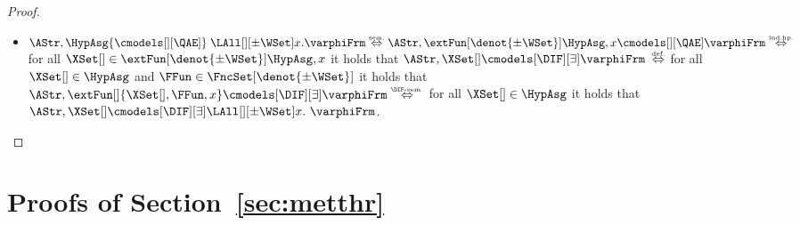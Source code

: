 \documentclass[authoryear]{elsarticle}
\newcommand{\iffExpl}[1]{\mathrel{\stackrel{\text{\tiny #1}}{\Leftrightarrow}}}
\newcommand{\Team}[1][]{{\XSet[#1]}}
\newcommand{\AEmodels}{{\cmodels[][\QAE]}}
\begin{document}
\begin{proof}
\begin{itemize}
\begin{itemize}
    \item[{$(\varphiFrm[][_\forall] = \LAll[][\pm\WSet] x. \varphiFrm)$}]
      $\AStr, \HypAsg \AEmodels\; \LAll[][\pm\WSet] x. \varphiFrm \iffExpl{sem.}
      \AStr, \extFun[\denot{\pm\WSet}]{\HypAsg, x} \AEmodels \varphiFrm
      \iffExpl{ind.hp.}$ for all $\Team \in \extFun[\denot{\pm\WSet}]{\HypAsg,
        x}$ it holds that $\AStr, \Team\cmodels[\DIF][\exists] \varphiFrm$
      $\iffExpl{def.}$ for all $\Team \in \HypAsg$ and $\FFun \in
      \FncSet[\denot{\pm\WSet}]{}$ it holds that $\AStr,
      \extFun[]{\Team,\FFun,x}\cmodels[\DIF][\exists]\varphiFrm\iffExpl{\DIF-sem.}$
      for all $\Team \in \HypAsg$ it holds that $\AStr, \Team
      \cmodels[\DIF][\exists] \LAll[][\pm\WSet] x.\ \varphiFrm$.
      \qedhere
    \end{itemize}
  \end{itemize}
\end{proof}







\section{Proofs of Section~\ref{sec:metthr}}
\label{app:metthr}
\end{document}
